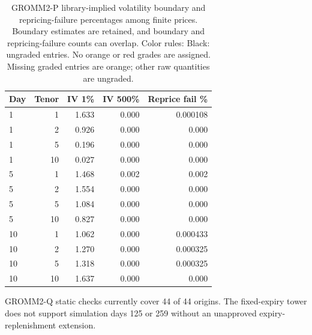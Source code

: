\documentclass[11pt]{article}
\begin{document}
\begin{table}[H]\centering\small\setlength{\tabcolsep}{4pt}
\caption{GROMM2-P library-implied volatility boundary and repricing-failure percentages among finite prices. Boundary estimates are retained, and boundary and repricing-failure counts can overlap. Color rules: Black: ungraded entries. No orange or red grades are assigned. Missing graded entries are orange; other raw quantities are ungraded.}\label{tab:gromm2-p-static-iv}
\begin{tabular}{@{}lrrrr@{}}
\toprule
Day & Tenor & IV 1\% & IV 500\% & Reprice fail \% \\
\midrule
1 & 1 & 1.633 & 0.000 & 0.000108 \\
1 & 2 & 0.926 & 0.000 & 0.000 \\
1 & 5 & 0.196 & 0.000 & 0.000 \\
1 & 10 & 0.027 & 0.000 & 0.000 \\
5 & 1 & 1.468 & 0.002 & 0.002 \\
5 & 2 & 1.554 & 0.000 & 0.000 \\
5 & 5 & 1.084 & 0.000 & 0.000 \\
5 & 10 & 0.827 & 0.000 & 0.000 \\
10 & 1 & 1.062 & 0.000 & 0.000433 \\
10 & 2 & 1.270 & 0.000 & 0.000325 \\
10 & 5 & 1.318 & 0.000 & 0.000325 \\
10 & 10 & 1.637 & 0.000 & 0.000 \\
\bottomrule\end{tabular}\end{table}

GROMM2-Q static checks currently cover 44 of 44 origins. The fixed-expiry tower does not support simulation days 125 or 259 without an unapproved expiry-replenishment extension.
\end{document}
